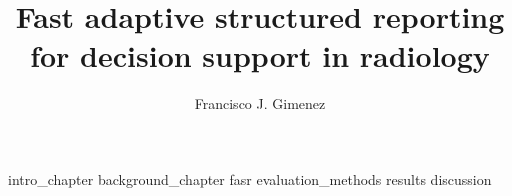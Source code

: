 \documentclass[12pt,twoside]{report}		%
\title{Fast adaptive structured reporting for decision support in radiology}
\author{Francisco J. Gimenez}
\begin{document}
\beforepreface						%



%
\ifproposal 						%
\else 
	 
\fi	


{ \hypersetup{hidelinks}			%
  \contentstablesfigures }			%
\startmaindoc						%


{intro_chapter}
{background_chapter}
{fasr}
{evaluation_methods}
{results}
{discussion}



%


\end{document}
